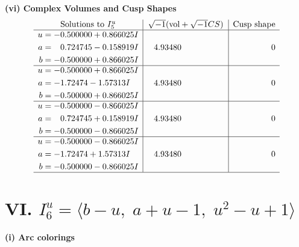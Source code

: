 \documentclass[1p]{elsarticle_modified}
\theoremstyle{definition}
\newcommand{\I}{\sqrt{-1}}
\begin{document}
\newpage\flushleft \textbf{(vi) Complex Volumes and Cusp Shapes}
$$\begin{array}{c|c|c}  
\text{Solutions to }I^u_{5}& \I (\text{vol} + \sqrt{-1}CS) & \text{Cusp shape}\\
 \hline 
\begin{aligned}
u &= -0.500000 + 0.866025 I \\
a &= \phantom{-}0.724745 - 0.158919 I \\
b &= -0.500000 + 0.866025 I\end{aligned}
 & \phantom{-}4.93480\phantom{ +0.000000I} & \phantom{-0.000000 } 0 \\ \hline\begin{aligned}
u &= -0.500000 + 0.866025 I \\
a &= -1.72474 - 1.57313 I \\
b &= -0.500000 + 0.866025 I\end{aligned}
 & \phantom{-}4.93480\phantom{ +0.000000I} & \phantom{-0.000000 } 0 \\ \hline\begin{aligned}
u &= -0.500000 - 0.866025 I \\
a &= \phantom{-}0.724745 + 0.158919 I \\
b &= -0.500000 - 0.866025 I\end{aligned}
 & \phantom{-}4.93480\phantom{ +0.000000I} & \phantom{-0.000000 } 0 \\ \hline\begin{aligned}
u &= -0.500000 - 0.866025 I \\
a &= -1.72474 + 1.57313 I \\
b &= -0.500000 - 0.866025 I\end{aligned}
 & \phantom{-}4.93480\phantom{ +0.000000I} & \phantom{-0.000000 } 0\\
 \hline 
 \end{array}$$\newpage\newpage\renewcommand{\arraystretch}{1}
\centering \section*{VI. $I^u_{6}= \langle b- u,\;a+u-1,\;u^2- u+1 \rangle$}
\flushleft \textbf{(i) Arc colorings}\\
\end{document}
